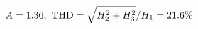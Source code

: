 \documentclass[preview]{standalone}
\begin{document}
\begin{align*}
\special{dvisvgm:raw <g id='unique000'>}A=1.36,\ \text{THD}=\sqrt{H_2^2+H_3^2}/H_1=21.6\%\special{dvisvgm:raw </g>}
\end{align*}
\end{document}
